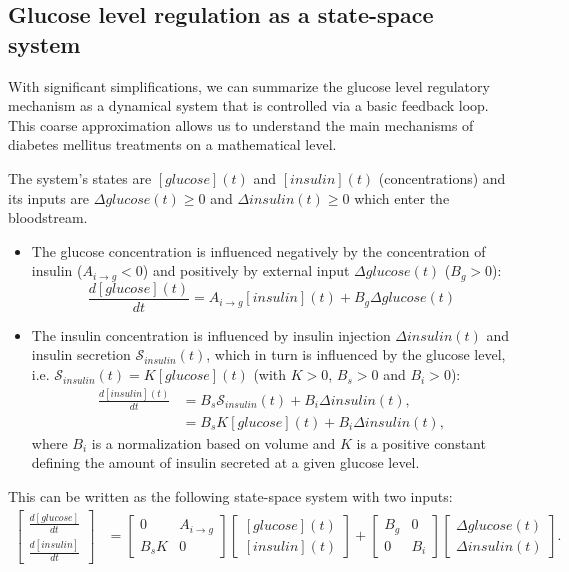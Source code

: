 
\ifx
\subsection{Glucose level regulation as a state-space system}
With significant simplifications, we can summarize the glucose level regulatory mechanism as a dynamical system that is controlled via a basic feedback loop. This coarse approximation allows us to understand the main mechanisms of diabetes mellitus treatments on a mathematical level.

The system's states are $[glucose](t)$ and $[insulin](t)$ (concentrations) and its inputs are $\Delta glucose(t) \geq 0$ and $\Delta insulin(t) \geq 0$ which enter the bloodstream. 
\begin{itemize}
\item The glucose concentration is influenced negatively by the concentration of insulin ($A_{i\rightarrow g} < 0$) and positively by external input $\Delta glucose(t)$ ($B_g > 0$):
\begin{equation*}
\frac{d [glucose](t)}{d t} = A_{i\rightarrow g} [insulin](t) + B_g \Delta glucose(t)
\end{equation*}
\item The insulin concentration is influenced by insulin injection $\Delta insulin(t)$ and insulin secretion $\mathcal{S}_{insulin}(t)$, which in turn is influenced by the glucose level, i.e. $\mathcal{S}_{insulin}(t) = K[glucose](t)$ (with $K > 0$, $B_s > 0$ and $B_i > 0$):
\begin{align*}
\frac{d [insulin](t)}{d t} &= B_s \mathcal{S}_{insulin}(t) + B_i \Delta insulin(t), \\
        &= B_s K [glucose](t) + B_i \Delta insulin(t),
\end{align*}
where $B_i$ is a normalization based on volume and $K$ is a positive constant defining the amount of insulin secreted at a given glucose level.
\end{itemize}

This can be written as the following state-space system with two inputs:
\begin{align*}
\begin{bmatrix}
\frac{d [glucose]}{d t} \\
\frac{d [insulin]}{d t}
\end{bmatrix}
&= 
\begin{bmatrix}
0                    & A_{i\rightarrow g} \\
B_s K   & 0
\end{bmatrix}
\begin{bmatrix}
[glucose](t) \\
[insulin](t)
\end{bmatrix}
+
\begin{bmatrix}
B_g & 0 \\
0   & B_i
\end{bmatrix} 
\begin{bmatrix} 
\Delta glucose(t) \\
\Delta insulin(t)
\end{bmatrix}.
\end{align*}

